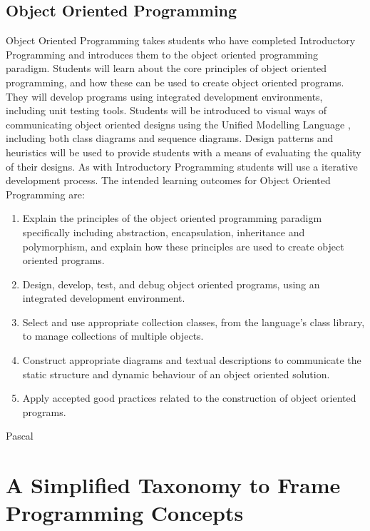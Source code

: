 \subsection{Object Oriented Programming} %
\label{sub:object_oriented_programming}


Object Oriented Programming takes students who have completed Introductory Programming and introduces them to the object oriented programming paradigm. Students will learn about the core principles of object oriented programming, and how these can be used to create object oriented programs. They will develop programs using integrated development environments, including  unit testing tools. Students will be introduced to visual ways of communicating object oriented designs using the Unified Modelling Language \cite{Fowler:2004}, including both class diagrams and sequence diagrams. Design patterns and heuristics will be used to provide students with a means of evaluating the quality of their designs. As with Introductory Programming students will use a iterative development process. The intended learning outcomes for Object Oriented Programming are:
\begin{enumerate}
	\item Explain the principles of the object oriented programming paradigm specifically including abstraction, encapsulation, inheritance and polymorphism, and explain how these principles are used to create object oriented programs.
	\item Design, develop, test, and debug object oriented programs, using an integrated development environment.
	\item Select and use appropriate collection classes, from the language's class library, to manage collections of multiple objects.
	\item Construct appropriate diagrams and textual descriptions to communicate the static structure and dynamic behaviour of an object oriented solution.
	\item Apply accepted good practices related to the construction of object oriented programs.
\end{enumerate}


Pascal \cite{Becker:2002}




\section{A Simplified Taxonomy to Frame Programming Concepts} %
\label{sec:a_simplified_taxonomy_to_frame_programming_concepts}

